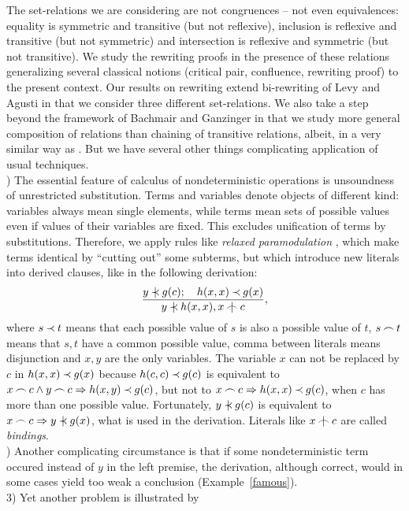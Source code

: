 The
set-relations we are considering are not congruences -- not even equivalences: 
equality is
symmetric and transitive (but not reflexive), inclusion is reflexive and
transitive (but not symmetric) and intersection is reflexive and symmetric
(but not transitive). We study the rewriting proofs in the presence of these
relations generalizing several classical notions (critical pair, confluence,
rewriting proof) to the present context. Our results on rewriting extend
bi-rewriting of Levy and Agusti \cite{LA} in that we consider three different
set-relations. We also take a step beyond the framework of Bachmair and
Ganzinger \cite{BG249} in that we study more general composition of relations
than chaining of transitive relations, albeit, in a very similar way as \cite
{BG-Oslo}.  But we have several other things complicating application of usual
techniques. \\[1ex]
%
) 
The essential feature of calculus of nondeterministic operations is
unsoundness of unrestricted substitution. Terms and variables denote objects
of different kind: variables always mean single elements, while terms mean
sets of possible values even if values of their variables are fixed.  This
excludes unification of terms by substitutions.  Therefore, we apply rules
like {\em relaxed paramodulation} \cite {relaxed-par}, which make terms
identical by ``cutting out'' some subterms, but which introduce new literals
into derived clauses, like in the following derivation:
\[
\prule {y\notIncl g(c); \quad h(x,x)\Incl g(x)}{y\notIncl h(x,x), x\notInt c},
\] 
where \(s\mathbin{\prec} t\) means that each possible value of $s$ is also a possible
value of $t$, \(s\mathbin{\frown} t\) means that $s,t$ have a common possible value,
comma between literals means disjunction and $x,y$ are the only variables.
The variable $x$ can not be replaced by $c$ in \(h(x,x)\mathbin{\prec} g(x)\) because
\(h(c,c)\mathbin{\prec} g(c)\) is equivalent to \(x\mathbin{\frown} c\land y\mathbin{\frown} c\mathrel\Rightarrow h(x,y)\mathbin{\prec}
g(c)\), but not to \(x\mathbin{\frown} c\mathrel\Rightarrow h(x,x)\mathbin{\prec} g(c)\), when $c$ has more than
one possible value.  Fortunately, \(y\notIncl g(c)\) is equivalent to \(x\Int
c\then y\notIncl g(x)\), what is used in the derivation.  Literals like
\(x\notInt c\) are called {\em bindings}.\\[1ex]
%
) 
Another complicating circumstance is that
if some nondeterministic term occured instead of $y$ in the left premise,
the derivation, although  correct, would in some cases yield too weak a 
conclusion (Example~\ref {famous}).  \\[1ex]
3) Yet another problem is illustrated by
